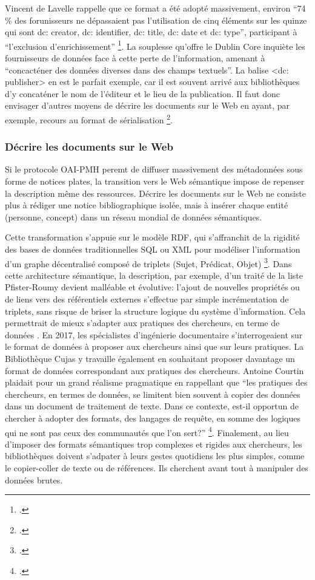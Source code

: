Vincent de Lavelle rappelle que ce format a été adopté massivement, environ \enquote{74 \% des forunisseurs ne dépassaient pas l'utilisation de cinq éléments sur les quinze qui sont dc: creator, dc: identifier, dc: title, dc: date et dc: type}, participant à \enquote{l'exclusion d'enrichissement} \footcite{lavennedelamontoiseOAIPMHPMHLheure2020}. La souplesse qu'offre le Dublin Core inquiète les fournisseurs de données face à cette perte de l'information, amenant à \enquote{concacténer des données diverses dans des champs textuels}. La balise <dc: publisher> en est le parfait exemple, car il est souvent arrivé aux bibliothèques d'y concaténer le nom de l'éditeur et le lieu de la publication. Il faut donc envisager d'autres moyens de décrire les documents sur le Web en ayant, par exemple, recours au format de sérialisation \footcite{lavennedelamontoiseOAIPMHPMHLheure2020}.

\subsubsection{Décrire les documents sur le Web}
Si le protocole \ac{OAI-PMH} peremt de diffuser massivement des métadonnées sous forme de notices plates, la transition vers le Web sémantique impose de repenser la description même des ressources. Décrire les documents sur le Web ne consiste plus à rédiger une notice bibliographique isolée, mais à insérer chaque entité (personne, concept) dans un réseau mondial de données sémantiques. 

Cette transformation s'appuie sur le modèle \ac{RDF}, qui s'affranchit de la rigidité des bases de données traditionnelles \ac{SQL} ou \ac{XML} pour modéliser l'information d'un graphe décentralisé composé de triplets (Sujet, Prédicat, Objet) \footcite{bermesWebSemantiqueBibliotheque2013}. Dans cette architecture sémantique, la description, par exemple, d'un traité de la liste Pfister-Roumy devient malléable et évolutive: l'ajout de nouvelles propriétés ou de liens vers des référentiels externes s'effectue par simple incrémentation de triplets, sans risque de briser la structure logique du système d'information. Cela permettrait de mieux s'adapter aux pratiques des chercheurs, en terme de données . En 2017, les spécialistes d'ingénierie documentaire s'interrogeaient sur le format de données à proposer aux chercheurs ainsi que sur leurs pratiques. La Bibliothèque Cujas y travaille également en souhaitant  proposer davantage un format de données correspondant aux pratiques des chercheurs. Antoine Courtin plaidait pour un grand réalisme pragmatique en rappellant que \enquote{les pratiques des chercheurs, en termes de données, se limitent bien souvent à copier des données dans un document de traitement de texte. Dans ce contexte, est-il opportun de chercher à adopter des formats, des langages de requête, en somme des logiques qui ne sont pas ceux des communautés que l'on sert?} \footcite{chaineuxLentreeDansWeb}. Finalement, au lieu d'imposer des formats sémantiques trop complexes et rigides aux chercheurs, les bibliothèques doivent s'adpater à leurs gestes quotidiens les plus simples, comme le copier-coller de texte ou de références. Ils cherchent avant tout à manipuler des données brutes. 

